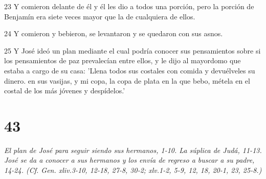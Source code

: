 \par 23 Y comieron delante de él y él les dio a todos una porción, pero la porción de Benjamín era siete veces mayor que la de cualquiera de ellos.
\par 24 Y comieron y bebieron, se levantaron y se quedaron con sus asnos.
\par 25 Y José ideó un plan mediante el cual podría conocer sus pensamientos sobre si los pensamientos de paz prevalecían entre ellos, y le dijo al mayordomo que estaba a cargo de su casa: 'Llena todos sus costales con comida y devuélveles su dinero. en sus vasijas, y mi copa, la copa de plata en la que bebo, métela en el costal de los más jóvenes y despídelos.'

\chapter{43}

\par \textit{El plan de José para seguir siendo sus hermanos, 1-10. La súplica de Judá, 11-13. José se da a conocer a sus hermanos y los envía de regreso a buscar a su padre, 14-24. (Cf. Gen. xliv.3-10, 12-18, 27-8, 30-2; xlv.1-2, 5-9, 12, 18, 20-1, 23, 25-8.)}

